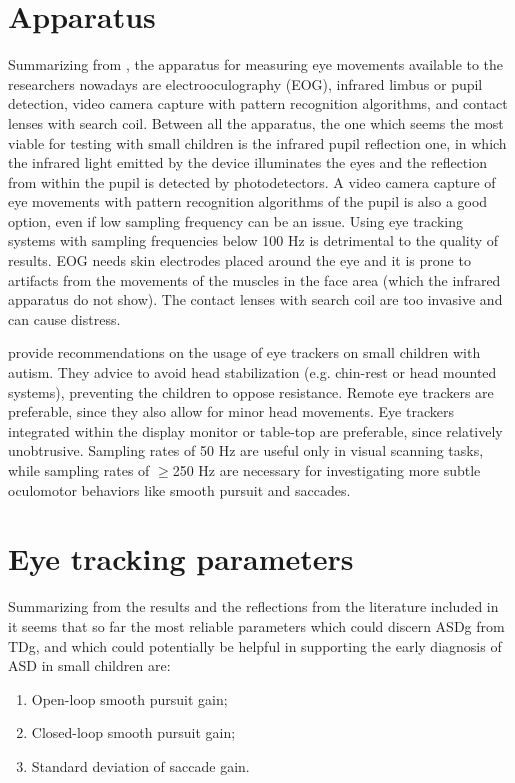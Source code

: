 \section{Apparatus}
\label{sec:fwkapparatus}

Summarizing from \cite{smyrnis2008guidelines}, the apparatus for measuring eye movements available to the researchers nowadays are electrooculography (EOG), infrared limbus or pupil detection, video camera capture with pattern recognition algorithms, and contact lenses with search coil.
Between all the apparatus, the one which seems the most viable for testing with small children is the infrared pupil reflection one, in which the infrared light emitted by the device illuminates the eyes and the reflection from within the pupil is detected by photodetectors. A video camera capture of eye movements with pattern recognition algorithms of the pupil is also a good option, even if low sampling frequency can be an issue. Using eye tracking systems with sampling frequencies below 100 Hz is detrimental to the quality of results.
EOG needs skin electrodes placed around the eye and it is prone to artifacts from the movements of the muscles in the face area (which the infrared apparatus do not show). The contact lenses with search coil are too invasive and can cause distress.

\cite{sasson2012children} provide recommendations on the usage of eye trackers on small children with autism. They advice to avoid head stabilization (e.g. chin-rest or head mounted systems), preventing the children to oppose resistance. Remote eye trackers are preferable, since they also allow for minor head movements. Eye trackers integrated within the display monitor or table-top are preferable, since relatively unobtrusive. Sampling rates of 50 Hz are useful only in visual scanning tasks, while sampling rates of \(\geq\)250 Hz are necessary for investigating more subtle oculomotor behaviors like smooth pursuit and saccades. 

\section{Eye tracking parameters}
\label{sec:fwkparameters}

Summarizing from the results and the reflections from the literature included in  it seems that so far the most reliable parameters which could discern ASDg from TDg, and which could potentially be helpful in supporting the early diagnosis of ASD in small children are:
\begin{enumerate}
    \item Open-loop smooth pursuit gain;
    \item Closed-loop smooth pursuit gain;
    \item Standard deviation of saccade gain.
\end{enumerate}


